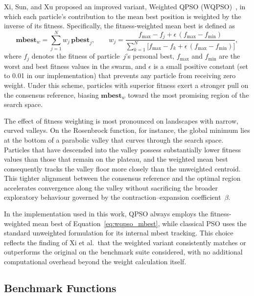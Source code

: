 Xi, Sun, and Xu proposed an improved variant, Weighted QPSO
(WQPSO)~\cite{Xi2008}, in which each particle's contribution to the mean best
position is weighted by the inverse of its fitness.  Specifically, the
fitness-weighted mean best is defined as
\begin{equation}
  \mathbf{mbest}_w = \sum_{j=1}^{N} w_j\,\mathbf{pbest}_j,
  \qquad
  w_j = \frac{f_{\max} - f_j + \epsilon\,(f_{\max} - f_{\min})}
             {\displaystyle\sum_{k=1}^{N}
              \bigl[f_{\max} - f_k + \epsilon\,(f_{\max} - f_{\min})\bigr]},
  \label{eq:wqpso_mbest}
\end{equation}
where $f_j$ denotes the fitness of particle~$j$'s personal best, $f_{\max}$
and $f_{\min}$ are the worst and best fitness values in the swarm, and
$\epsilon$ is a small positive constant (set to 0.01 in our implementation)
that prevents any particle from receiving zero weight.  Under this scheme,
particles with superior fitness exert a stronger pull on the consensus
reference, biasing $\mathbf{mbest}_w$ toward the most promising region of the
search space.

The effect of fitness weighting is most pronounced on landscapes with narrow,
curved valleys.  On the Rosenbrock function, for instance, the global minimum
lies at the bottom of a parabolic valley that curves through the search space.
Particles that have descended into the valley possess substantially lower
fitness values than those that remain on the plateau, and the weighted mean
best consequently tracks the valley floor more closely than the unweighted
centroid.  This tighter alignment between the consensus reference and the
optimal region accelerates convergence along the valley without sacrificing
the broader exploratory behaviour governed by the contraction--expansion
coefficient~$\beta$.

In the implementation used in this work, QPSO always employs the
fitness-weighted mean best of Equation~\eqref{eq:wqpso_mbest}, while classical
PSO uses the standard unweighted formulation for its internal mbest tracking.
This choice reflects the finding of Xi et al.\ that the weighted variant
consistently matches or outperforms the original on the benchmark suite
considered, with no additional computational overhead beyond the weight
calculation itself.


\subsection{Benchmark Functions}
\label{sec:bg:benchmarks}

